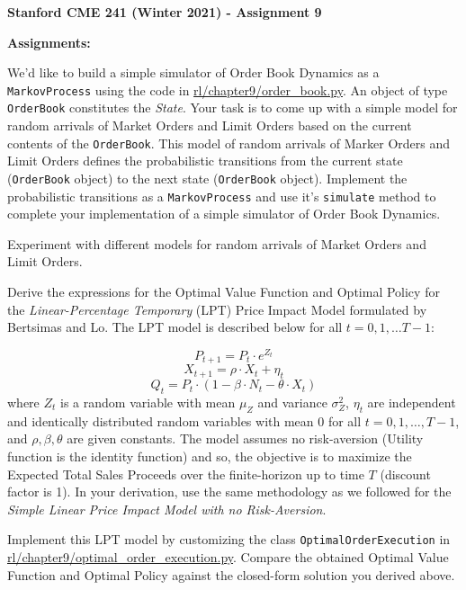 \documentclass[12pt]{exam}
\begin{document}
\begin{center}
{\large {\bf Stanford CME 241 (Winter 2021) - Assignment 9}}
\end{center}
 
{\large{\bf Assignments:}}
\begin{questions}
\question We'd like to build a simple simulator of Order Book Dynamics as a \lstinline{MarkovProcess} using the code in \href{https://github.com/TikhonJelvis/RL-book/blob/master/rl/chapter9/order_book.py}{rl\//chapter9\//order\_book.py}. An object of type \lstinline{OrderBook} constitutes the {\em State}. Your task is to come up with a simple model for random arrivals of Market Orders and Limit Orders based on the current contents of the \lstinline{OrderBook}. This model of random arrivals of Marker Orders and Limit Orders defines the probabilistic transitions from the current state (\lstinline{OrderBook} object) to the next state (\lstinline{OrderBook} object). Implement the probabilistic transitions as a \lstinline{MarkovProcess} and use it's \lstinline{simulate} method to complete your implementation of a simple simulator of Order Book Dynamics.

Experiment with different models for random arrivals of Market Orders and Limit Orders.

\question Derive the expressions for the Optimal Value Function and Optimal Policy for the {\em Linear-Percentage Temporary} (LPT) Price Impact Model formulated by Bertsimas and Lo. The LPT model is described below for all $t = 0, 1, \ldots T-1$:

$$P_{t+1} = P_t \cdot e^{Z_t}$$
$$X_{t+1} = \rho \cdot X_t + \eta_t$$
$$Q_t = P_t \cdot (1 - \beta \cdot N_t - \theta \cdot X_t)$$
where $Z_t$ is a random variable with mean $\mu_Z$ and variance $\sigma^2_Z$, $\eta_t$ are independent and identically distributed random variables with mean 0 for all $t = 0, 1, \ldots, T-1$, and $\rho, \beta, \theta$ are given constants. The model assumes no risk-aversion (Utility function is the identity function) and so, the objective is to maximize the Expected Total Sales Proceeds over the finite-horizon up to time $T$ (discount factor is 1). In your derivation, use the same methodology as we followed for the {\em Simple Linear Price Impact Model with no Risk-Aversion}.

Implement this LPT model by customizing the class \lstinline{OptimalOrderExecution} in \href{https://github.com/TikhonJelvis/RL-book/blob/master/rl/chapter9/optimal_order_execution.py}{rl\//chapter9\//optimal\_order\_execution.py}.  Compare the obtained Optimal Value Function and Optimal Policy against the closed-form solution you derived above.

\end{questions}
\end{document}
